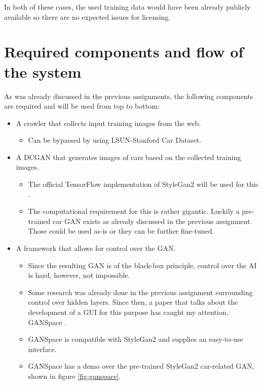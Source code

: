 In both of these cases, the used training data would have been already publicly available so there are no expected issues for licensing.


\clearpage
\section{Required components and flow of the system}
\label{sec:required_components}

As was already discussed in the previous assignments, the following components are required and will be used from top to bottom:

\begin{itemize}
    \item A crawler that collects input training images from the web.
    \begin{itemize}
        \item Can be bypassed by using LSUN-Stanford Car Dataset.
    \end{itemize}
    \item A DCGAN that generates images of cars based on the collected training images.
    \begin{itemize}
        \item The official TensorFlow implementation of StyleGan2 will be used for this \citep{stylegan2}.
        \item The computational requirement for this is rather gigantic. Luckily a pre-trained car GAN exists as already discussed in the previous assignment. Those could be used as-is or they can be further fine-tuned.
    \end{itemize}
    \item A framework that allows for control over the GAN.
    \begin{itemize}
        \item Since the resulting GAN is of the black-box principle, control over the AI is hard, however, not impossible.
        \item Some research was already done in the previous assignment surrounding control over hidden layers. Since then, a paper that talks about the development of a GUI for this purpose has caught my attention, GANSpace \citep{ganspace}.
        \item GANSpace is compatible with StyleGan2 \citep{ganspace} and supplies an easy-to-use interface.
        \item GANSpace has a demo over the pre-trained StyleGan2 car-related GAN, shown in figure \ref{fig:ganspace}.

\end{itemize}
\end{itemize}
